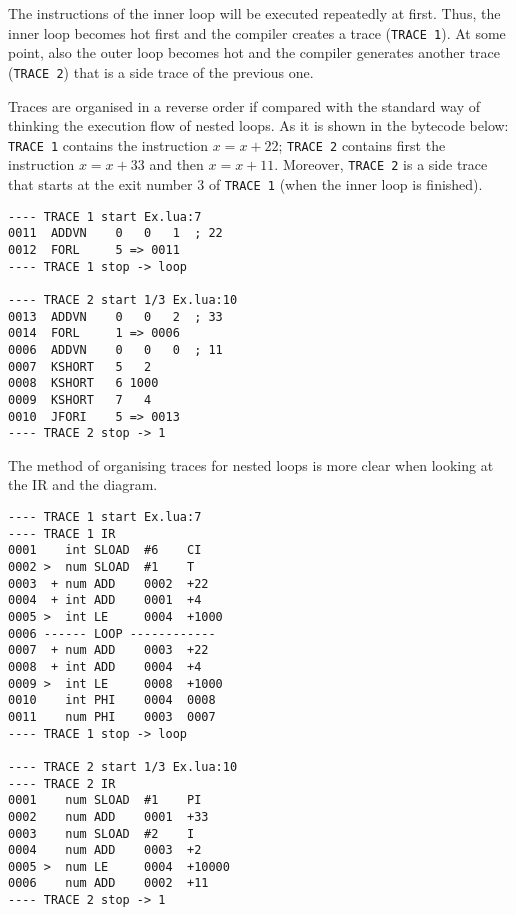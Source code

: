 \noindent
The instructions of the inner loop will be executed repeatedly at first. Thus, the inner loop becomes hot first and the compiler creates a trace (\texttt{TRACE 1}). At some point, also the outer loop becomes hot and the compiler generates another trace (\texttt{TRACE 2}) that is a side trace of the previous one.

Traces are organised in a reverse order if compared with the standard way of thinking the execution flow of nested loops. As it is shown in the bytecode below: \texttt{TRACE 1} contains the instruction $x=x+22$;  \texttt{TRACE 2} contains first the instruction $x=x+33$ and then $x=x+11$. Moreover, \texttt{TRACE 2} is a side trace that starts at the exit number 3 of \texttt{TRACE 1} (when the inner loop is finished).

\begin{multicols}{2}
\begin{lstlisting}[style=DumpStyle]
---- TRACE 1 start Ex.lua:7
0011  ADDVN    0   0   1  ; 22
0012  FORL     5 => 0011
---- TRACE 1 stop -> loop

---- TRACE 2 start 1/3 Ex.lua:10
0013  ADDVN    0   0   2  ; 33
0014  FORL     1 => 0006
0006  ADDVN    0   0   0  ; 11
0007  KSHORT   5   2
0008  KSHORT   6 1000
0009  KSHORT   7   4
0010  JFORI    5 => 0013
---- TRACE 2 stop -> 1
\end{lstlisting}
\end{multicols}

\noindent
The method of organising traces for nested loops is more clear when looking at the IR and the diagram.

\begin{multicols}{2}
\begin{lstlisting}[style=DumpStyle]
---- TRACE 1 start Ex.lua:7
---- TRACE 1 IR
0001    int SLOAD  #6    CI
0002 >  num SLOAD  #1    T
0003  + num ADD    0002  +22 
0004  + int ADD    0001  +4  
0005 >  int LE     0004  +1000
0006 ------ LOOP ------------
0007  + num ADD    0003  +22 
0008  + int ADD    0004  +4  
0009 >  int LE     0008  +1000
0010    int PHI    0004  0008
0011    num PHI    0003  0007
---- TRACE 1 stop -> loop

---- TRACE 2 start 1/3 Ex.lua:10
---- TRACE 2 IR
0001    num SLOAD  #1    PI
0002    num ADD    0001  +33 
0003    num SLOAD  #2    I
0004    num ADD    0003  +2  
0005 >  num LE     0004  +10000
0006    num ADD    0002  +11 
---- TRACE 2 stop -> 1
\end{lstlisting}
\end{multicols}

